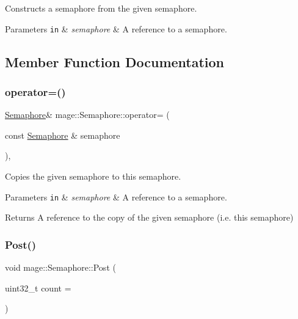Constructs a semaphore from the given semaphore.


\begin{DoxyParams}[1]{Parameters}
\mbox{\tt in}  & {\em semaphore} & A reference to a semaphore. \\
\hline
\end{DoxyParams}


\subsection{Member Function Documentation}
\hypertarget{classmage_1_1_semaphore_af3308cf7fa1ed33cda0ee53b9565f658}{}\label{classmage_1_1_semaphore_af3308cf7fa1ed33cda0ee53b9565f658} 
\subsubsection{\texorpdfstring{operator=()}{operator=()}}
{\footnotesize\ttfamily \hyperlink{classmage_1_1_semaphore}{Semaphore}\& mage\+::\+Semaphore\+::operator= (\begin{DoxyParamCaption}\item[{const \hyperlink{classmage_1_1_semaphore}{Semaphore} \&}]{semaphore }\end{DoxyParamCaption})\hspace{0.3cm}{\ttfamily [private]}, {\ttfamily [delete]}}

Copies the given semaphore to this semaphore.


\begin{DoxyParams}[1]{Parameters}
\mbox{\tt in}  & {\em semaphore} & A reference to a semaphore. \\
\hline
\end{DoxyParams}
\begin{DoxyReturn}{Returns}
A reference to the copy of the given semaphore (i.\+e. this semaphore) 
\end{DoxyReturn}
\hypertarget{classmage_1_1_semaphore_a354ea9743f9794b14a3f032e0443b214}{}\label{classmage_1_1_semaphore_a354ea9743f9794b14a3f032e0443b214} 
\subsubsection{\texorpdfstring{Post()}{Post()}}
{\footnotesize\ttfamily void mage\+::\+Semaphore\+::\+Post (\begin{DoxyParamCaption}\item[{uint32\+\_\+t}]{count = {} }\end{DoxyParamCaption})}

